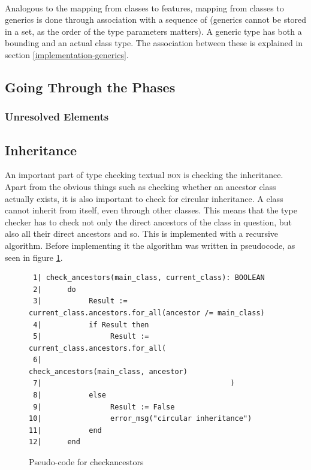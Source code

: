 \paragraph{} Analogous to the mapping from classes to features, mapping from classes to generics is done through association with a sequence of \tbongeneric  (generics cannot be stored in a set, as the order of the type parameters matters). A generic type has both a bounding and an actual class type. The association between these is explained in section \ref{implementation-generics}.

\subsection{Going Through the Phases}
\subsubsection{Unresolved Elements}
\label{implementation-unresolved-elements}

\label{implementation-generics}
\subsection{Inheritance}

An important part of type checking textual \textsc{bon} is checking the inheritance. Apart from the obvious things such as checking whether an ancestor class actually exists, it is also important to check for circular inheritance. A class cannot inherit from itself, even through other classes. This means that the type checker has to check not only the direct ancestors of the class in question, but also all their direct ancestors and so. This is implemented with a recursive algorithm. Before implementing it the algorithm was written in pseudocode, as seen in figure \ref{fig:check_ancestors_pseudocode}.
\begin{figure}[h]
{\footnotesize
\begin{verbatim}
 1| check_ancestors(main_class, current_class): BOOLEAN
 2|      do
 3|           Result := current_class.ancestors.for_all(ancestor /= main_class)
 4|           if Result then
 5|                Result := current_class.ancestors.for_all(
 6|                                            check_ancestors(main_class, ancestor)
 7|                                            )
 8|           else
 9|                Result := False
10|                error_msg("circular inheritance")
11|           end
12|      end
\end{verbatim}
}
\caption{Pseudo-code for check\textunderscore ancestors}
\label{fig:check_ancestors_pseudocode}
\end{figure}

